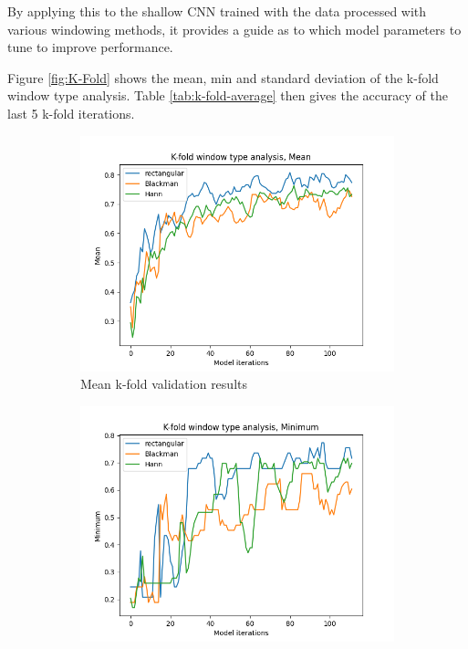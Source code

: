 \documentclass[class=report,11pt,crop=false]{standalone}
\begin{document}
By applying this to the shallow CNN trained with the data processed with various windowing methods, it provides a guide as to which model parameters to tune to improve performance. 

Figure \ref{fig:K-Fold} shows the mean, min and standard deviation of the k-fold window type analysis. Table \ref{tab:k-fold-average} then gives the accuracy of the last 5 k-fold iterations.

\begin{figure}[ht]
    \begin{subfigure}[b]{0.5\textwidth}
        \includegraphics[width=\linewidth]{Images/kfoldMean.png}
        \caption{Mean k-fold validation results}
        \label{fig:KMean}
    \end{subfigure}
    \hfill
    \begin{subfigure}[b]{0.5\textwidth}
        \includegraphics[width=\linewidth]{Images/kfoldMinimum.png}

\end{subfigure}
\end{figure}
\end{document}
